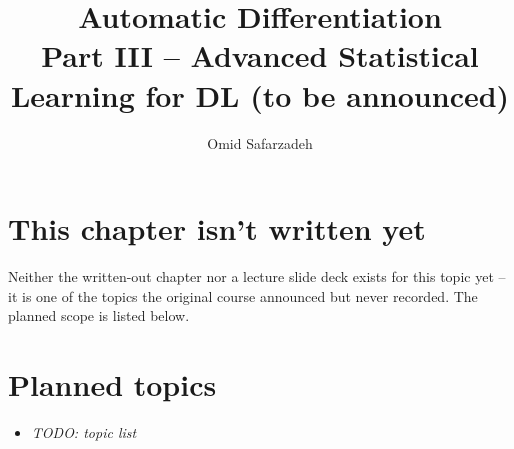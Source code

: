 \documentclass[11pt]{article}
\title{Automatic Differentiation \\ \large Part III -- Advanced Statistical Learning for DL (to be announced)}
\author{Omid Safarzadeh}
\date{}
\begin{document}
\maketitle

\section*{This chapter isn't written yet}
Neither the written-out chapter nor a lecture slide deck exists for this
topic yet -- it is one of the topics the original course announced but
never recorded. The planned scope is listed below.



\section*{Planned topics}
\begin{itemize}
  \item \textit{TODO: topic list}
\end{itemize}
\end{document}
